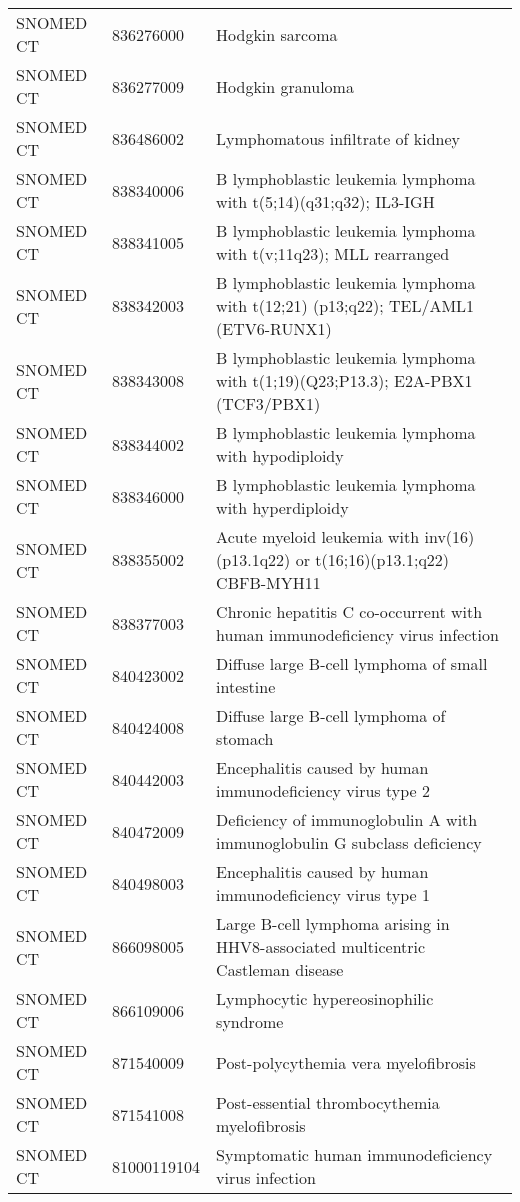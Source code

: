 \begin{longtable}{p{}p{}p{}}
  SNOMED CT & 836276000 & Hodgkin sarcoma \\ 
  SNOMED CT & 836277009 & Hodgkin granuloma \\ 
  SNOMED CT & 836486002 & Lymphomatous infiltrate of kidney \\ 
  SNOMED CT & 838340006 & B lymphoblastic leukemia lymphoma with t(5;14)(q31;q32); IL3-IGH \\ 
  SNOMED CT & 838341005 & B lymphoblastic leukemia lymphoma with t(v;11q23); MLL rearranged \\ 
  SNOMED CT & 838342003 & B lymphoblastic leukemia lymphoma with t(12;21) (p13;q22); TEL/AML1 (ETV6-RUNX1) \\ 
  SNOMED CT & 838343008 & B lymphoblastic leukemia lymphoma with t(1;19)(Q23;P13.3); E2A-PBX1 (TCF3/PBX1) \\ 
  SNOMED CT & 838344002 & B lymphoblastic leukemia lymphoma with hypodiploidy \\ 
  SNOMED CT & 838346000 & B lymphoblastic leukemia lymphoma with hyperdiploidy \\ 
  SNOMED CT & 838355002 & Acute myeloid leukemia with inv(16)(p13.1q22) or t(16;16)(p13.1;q22) CBFB-MYH11 \\ 
  SNOMED CT & 838377003 & Chronic hepatitis C co-occurrent with human immunodeficiency virus infection \\ 
  SNOMED CT & 840423002 & Diffuse large B-cell lymphoma of small intestine \\ 
  SNOMED CT & 840424008 & Diffuse large B-cell lymphoma of stomach \\ 
  SNOMED CT & 840442003 & Encephalitis caused by human immunodeficiency virus type 2 \\ 
  SNOMED CT & 840472009 & Deficiency of immunoglobulin A with immunoglobulin G subclass deficiency \\ 
  SNOMED CT & 840498003 & Encephalitis caused by human immunodeficiency virus type 1 \\ 
  SNOMED CT & 866098005 & Large B-cell lymphoma arising in HHV8-associated multicentric Castleman disease \\ 
  SNOMED CT & 866109006 & Lymphocytic hypereosinophilic syndrome \\ 
  SNOMED CT & 871540009 & Post-polycythemia vera myelofibrosis \\ 
  SNOMED CT & 871541008 & Post-essential thrombocythemia myelofibrosis \\ 
  SNOMED CT & 81000119104 & Symptomatic human immunodeficiency virus infection \\ 

\end{longtable}
